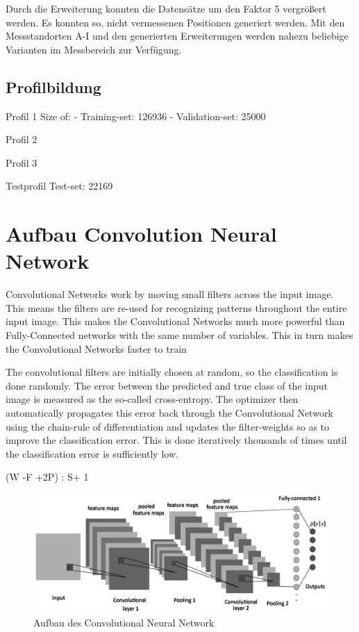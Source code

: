 Durch die Erweiterung konnten die Datensätze um den Faktor 5 vergrößert werden. Es konnten so, nicht vermessenen Positionen generiert werden. Mit den Messstandorten A-I und den generierten Erweiterungen werden nahezu beliebige Varianten im Messbereich zur Verfügung.


\subsection{Profilbildung}




Profil 1
Size of:
- Training-set:         126936
- Validation-set:       25000

Profil 2



Profil 3


Testprofil Test-set:             22169




\section{Aufbau Convolution Neural Network}




Convolutional Networks work by moving small filters across the input image. This means the filters are re-used for recognizing patterns throughout the entire input image. This makes the Convolutional Networks much more powerful than Fully-Connected networks with the same number of variables. This in turn makes the Convolutional Networks faster to train




The convolutional filters are initially chosen at random, so the classification is done randomly. The error between the predicted and true class of the input image is measured as the so-called cross-entropy. The optimizer then automatically propagates this error back through the Convolutional Network using the chain-rule of differentiation and updates the filter-weights so as to improve the classification error. This is done iteratively thousands of times until the classification error is sufficiently low.


(W -F +2P) : S+ 1



\begin{figure}[H]
	\centering
	\includegraphics[width=1\textwidth]
	{fig/CCN.png}
	\caption[Aufbau des Convolutional Neural Network]{Aufbau des Convolutional Neural Network}
	\label{fig:CCN}
\end{figure}





